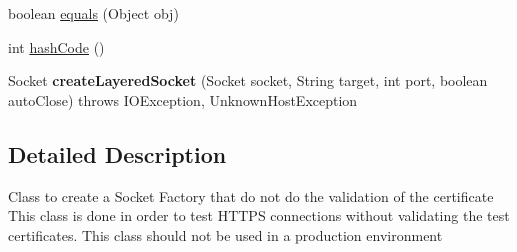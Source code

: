 \begin{DoxyCompactItemize}
\item 
boolean \hyperlink{classcom_1_1bluevia_1_1commons_1_1connector_1_1http_1_1SSL2wayForNonValidCertsSocketFactory_a68f0e3854158cbb39ab5619941fc8305}{equals} (Object obj)
\item 
int \hyperlink{classcom_1_1bluevia_1_1commons_1_1connector_1_1http_1_1SSL2wayForNonValidCertsSocketFactory_ab193741d3ccc5ef07a3a2d1b1c657d72}{hashCode} ()
\item 
\hypertarget{classcom_1_1bluevia_1_1commons_1_1connector_1_1http_1_1SSL2wayForNonValidCertsSocketFactory_a500881b8f8eb8449375cd74273c7a17b}{
Socket {\bfseries createLayeredSocket} (Socket socket, String target, int port, boolean autoClose)  throws IOException, UnknownHostException }
\label{classcom_1_1bluevia_1_1commons_1_1connector_1_1http_1_1SSL2wayForNonValidCertsSocketFactory_a500881b8f8eb8449375cd74273c7a17b}

\end{DoxyCompactItemize}


\subsection{Detailed Description}
Class to create a Socket Factory that do not do the validation of the certificate This class is done in order to test HTTPS connections without validating the test certificates. This class should not be used in a production environment 

